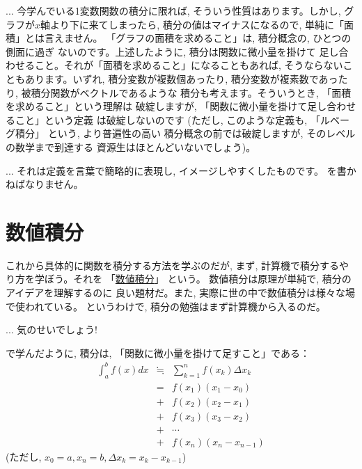 \begin{faq}{\small{} ... 今学んでいる1変数関数の積分に限れば, 
そういう性質はあります。しかし, グラフが$x$軸より下に来てしまったら, 
積分の値はマイナスになるので, 単純に「面積」とは言えません。
「グラフの面積を求めること」は, 積分概念の, ひとつの側面に過ぎ
ないのです。上述したように, 積分は関数に微小量を掛けて
足し合わせること。それが「面積を求めること」になることもあれば, 
そうならないこともあります。いずれ, 積分変数が複数個あったり, 
積分変数が複素数であったり, 被積分関数がベクトルであるような
積分も考えます。そういうとき, 「面積を求めること」という理解は
破綻しますが, 「関数に微小量を掛けて足し合わせること」という定義
は破綻しないのです (ただし, このような定義も, 「ルベーグ積分」
という, より普遍性の高い
積分概念の前では破綻しますが, そのレベルの数学まで到達する
資源生はほとんどいないでしょう)。}\end{faq}

\begin{faq}{\small{}
... それは定義を言葉で簡略的に表現し, イメージしやすくしたものです。
を書かねばなりません。}\end{faq}
\mv


\section{数値積分}\label{sect:suuchisekibun}

これから具体的に関数を積分する方法を学ぶのだが, まず, 
計算機で積分するやり方を学ぼう。それを
「\underline{数値積分}」 という。
数値積分は原理が単純で, 積分のアイデアを理解するのに
良い題材だ。また, 実際に世の中で数値積分は様々な場で使われている。
というわけで, 積分の勉強はまず計算機から入るのだ。

\begin{faq}{\small{} ... 気のせいでしょう!}\end{faq}

で学んだように, 
積分は, 「関数に微小量を掛けて足すこと」である：
\begin{eqnarray*}\int_{a}^{b}f(x)dx&\fallingdotseq&\sum^{n}_{k=1} f(x_k)\Delta x_k\\
&=&f(x_1)(x_1-x_0)\\
&+&f(x_2)(x_2-x_1)\\
&+&f(x_3)(x_3-x_2)\\
&+&\cdots\\
&+&f(x_n)(x_n-x_{n-1})
\end{eqnarray*}
(ただし, $x_0=a, x_n=b, \Delta x_k=x_k-x_{k-1}$)

